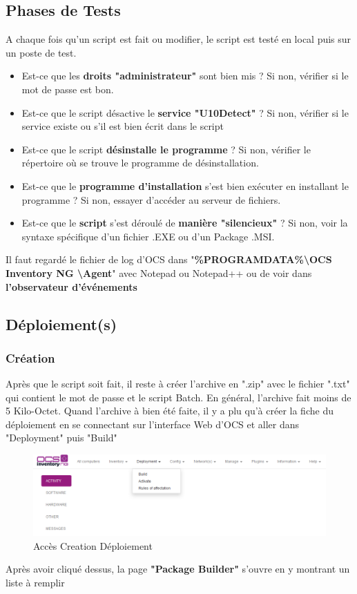 \documentclass[11pt,a4paper,oneside]{article}
\begin{document}
\subsection{Phases de Tests}
A chaque fois qu'un script est fait ou modifier, le script est testé en local puis sur un poste de test.\\
\begin{itemize} 
	\item Est-ce que les \textbf{droits "administrateur"} sont bien mis ? Si non, vérifier si le mot de passe est bon. 
	\item Est-ce que le script désactive le \textbf{service "U10Detect"} ? Si non, vérifier si le service existe ou s'il est bien écrit dans le script
	\item Est-ce que le script \textbf{désinstalle le programme} ? Si non, vérifier le répertoire où se trouve le programme de désinstallation.
	\item Est-ce que le \textbf{programme d'installation} s'est bien exécuter en installant le programme ? Si non, essayer d'accéder au serveur de fichiers.
	\item Est-ce que le \textbf{script} s'est déroulé de \textbf{manière "silencieux"} ? Si non, voir la syntaxe spécifique d'un fichier .EXE ou d'un Package .MSI. \\
\end{itemize}
Il faut regardé le fichier de log d'OCS dans "\textbf{\%PROGRAMDATA\%\textbackslash OCS Inventory NG \textbackslash Agent}" avec Notepad ou Notepad++ ou de voir dans \textbf{l'observateur d'événements}
\newpage
\subsection{Déploiement(s)}
\subsubsection{Création}
Après que le script soit fait, il reste à créer l'archive en ".zip" avec le fichier ".txt" qui contient le mot de passe et le script Batch. En général, l'archive fait moins de 5 Kilo-Octet. Quand l'archive à bien été faite, il y a plu qu'à créer la fiche du déploiement en se connectant sur l'interface Web d'OCS et aller dans "Deployment" puis "Build"
\\
\begin{figure}[hbtp]
\centering
\includegraphics[scale=0.7]{Script/Deploiement1.PNG}
\caption{Accès Creation Déploiement}
\end{figure}
Après avoir cliqué dessus, la page \textbf{"Package Builder"} s'ouvre en y montrant un liste à remplir
\end{document}
